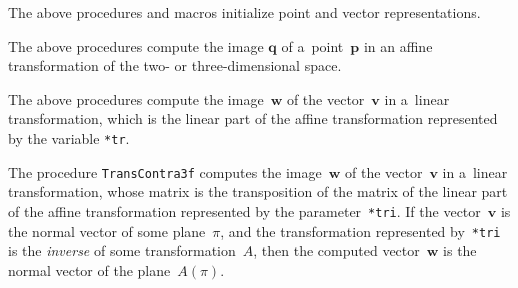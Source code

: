 \vspace{\bigskipamount}
The above procedures and macros initialize point and vector
representations.

\vspace{\bigskipamount}
The above procedures compute the image $\bm{q}$ of a~point~$\bm{p}$
in an affine transformation of the two- or three-dimensional space.

\vspace{\bigskipamount}
The above procedures compute the image~$\bm{w}$ of the vector~$\bm{v}$
in a~linear transformation, which is the linear part of the affine
transformation represented by the variable \texttt{*tr}.

\vspace{\bigskipamount}
The procedure \texttt{TransContra3f} computes the image~$\bm{w}$ of the
vector~$\bm{v}$ in a~linear transformation, whose matrix is the transposition
of the matrix of the linear part of the affine transformation represented by
the parameter~\texttt{*tri}. If the vector~$\bm{v}$ is the normal vector
of some plane~$\pi$, and the transformation represented by~\texttt{*tri}
is the \emph{inverse} of some transformation~$A$, then the computed
vector~$\bm{w}$ is the normal vector of the plane~$A(\pi)$.


